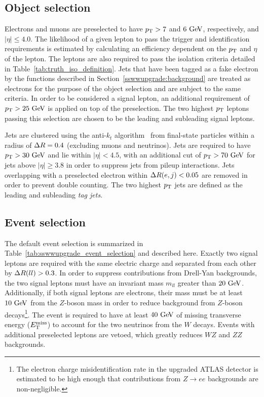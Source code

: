 \subsection{Object selection}\label{sswwupgrade:object_selection}
Electrons and muons are preselected to have $p_{\mathrm{T}} > 7$ and $6\gev$, respectively, and $|\eta| \le 4.0$.
The likelihood of a given lepton to pass the trigger and identification requirements is estimated by calculating an efficiency dependent on the $p_{\mathrm{T}}$ and $\eta$ of the lepton.
The leptons are also required to pass the isolation criteria detailed in Table~\ref{tab:truth_iso_definition}.
Jets that have been tagged as a fake electron by the functions described in Section~\ref{sswwupgrade:background} are treated as electrons for the purpose of the object selection and are subject to the same criteria.
In order to be considered a signal lepton, an additional requirement of $\pt > 25\gev$ is applied on top of the preselection.
The two highest $p_{\mathrm{T}}$ leptons passing this selection are chosen to be the leading and subleading signal leptons.

Jets are clustered using the anti-$k_t$ algorithm~\cite{2008.antikt} from final-state particles within a radius of $\Delta R = 0.4$ (excluding muons and neutrinos).
Jets are required to have $\pt > 30\gev$ and lie within $|\eta| < 4.5$, with an additional cut of $\pt > 70\gev$ for jets above $|\eta| \ge 3.8$ in order to suppress jets from pileup interactions.
Jets overlapping with a preselected electron within $\Delta R(e,j) < 0.05$ are removed in order to prevent double counting.
The two highest $p_{\mathrm{T}}$ jets are defined as the leading and subleading \emph{tag jets}.


\subsection{Event selection}\label{sswwupgrade:event_selection}
The default event selection is summarized in Table~\ref{tab:sswwupgrade_event_selection} and described here.
Exactly two signal leptons are required with the same electric charge and separated from each other by $\Delta R(ll) > 0.3$.
In order to suppress contributions from Drell-Yan backgrounds, the two signal leptons must have an invariant mass $m_{ll}$ greater than $20\gev$.
Additionally, if both signal leptons are electrons, their mass must be at least $10\gev$ from the $Z$-boson mass in order to reduce background from $Z$-boson decays\footnote{The electron charge misidentification rate in the upgraded ATLAS detector is estimated to be high enough that contributions from $Z\rightarrow ee$ backgrounds are non-negligible.}.
The event is required to have at least $40\gev$ of missing transverse energy ($E_{\mathrm{T}}^{\mathrm{miss}}$) to account for the two neutrinos from the $W$ decays.
Events with additional preselected leptons are vetoed, which greatly reduces $WZ$ and $ZZ$ backgrounds.

